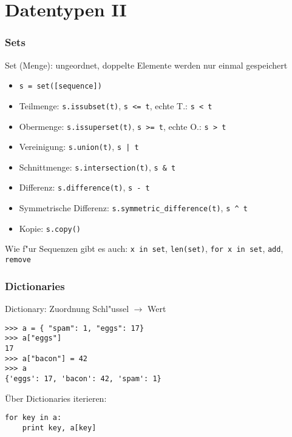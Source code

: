 \section{Datentypen II}

\begin{frame}[fragile]
\frametitle{Sets}
Set (Menge): ungeordnet, doppelte Elemente werden nur einmal gespeichert
\begin{itemize}
\item \lstinline{s = set([sequence])}
\item Teilmenge: \lstinline{s.issubset(t)}, \lstinline{s <= t}, echte T.: \lstinline{s < t}
\item Obermenge: \lstinline{s.issuperset(t)}, \lstinline{s >= t}, echte O.: \lstinline{s > t} 
\item Vereinigung: \lstinline{s.union(t)}, \lstinline{s | t}
\item Schnittmenge: \lstinline{s.intersection(t)}, \lstinline{s & t}
\item Differenz: \lstinline{s.difference(t)}, \lstinline{s - t}
\item Symmetrische Differenz: \lstinline{s.symmetric_difference(t)}, \lstinline{s ^ t}
\item Kopie: \lstinline{s.copy()}
\end{itemize}
Wie f"ur Sequenzen gibt es auch: \lstinline{x in set}, \lstinline{len(set)}, \lstinline{for x in set}, \lstinline{add}, \lstinline{remove}
\end{frame}

\begin{frame}[fragile]
\frametitle{Dictionaries}
Dictionary: Zuordnung Schl"ussel $\rightarrow$ Wert
\begin{lstlisting}[style=Shell]
>>> a = { "spam": 1, "eggs": 17}
>>> a["eggs"]
17
>>> a["bacon"] = 42
>>> a
{'eggs': 17, 'bacon': 42, 'spam': 1}
\end{lstlisting}
\"Uber Dictionaries iterieren:
\begin{lstlisting}[style=Python]
for key in a:
    print key, a[key]
\end{lstlisting}
\end{frame}

